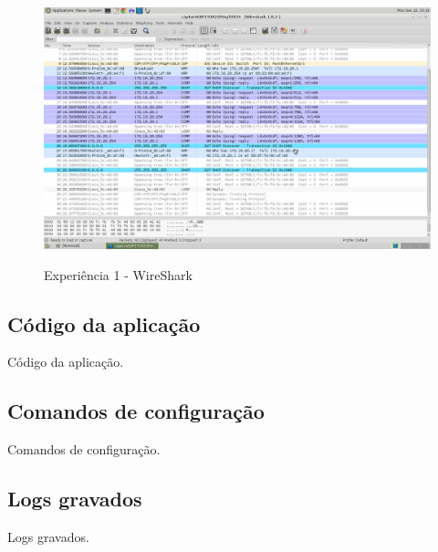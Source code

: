 \documentclass[a4paper]{article}
\begin{document}
\begin{figure}[h!]
\caption{Experiência 1 - WireShark}
\includegraphics[scale=0.25]{res/image2.png}
\label{fig:teste}
\end{figure}

\subsection{Código da aplicação}
Código da aplicação.

\subsection{Comandos de configuração}
Comandos de configuração.

\subsection{Logs gravados}
Logs gravados.
\end{document}
